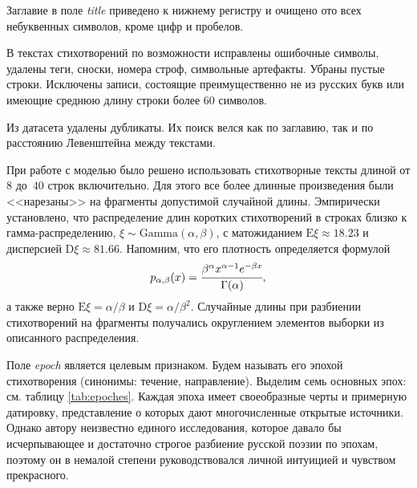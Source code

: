 \documentclass[a4paper,12pt]{article}
\begin{document}
Заглавие в поле \textit{title} приведено к нижнему регистру и очищено ото всех небуквенных символов, кроме цифр и пробелов.

В текстах стихотворений по возможности исправлены ошибочные символы, удалены теги, сноски, номера строф, символьные артефакты. Убраны пустые строки. Исключены записи, состоящие преимущественно не из русских букв или имеющие среднюю длину строки более $60$ символов.

Из датасета удалены дубликаты. Их поиск велся как по заглавию, так и по расстоянию Левенштейна между текстами.

При работе с моделью было решено использовать стихотворные тексты длиной от $8$ до~$40$ строк включительно. Для этого все более длинные произведения были <<нарезаны>> на фрагменты допустимой случайной длины. Эмпирически установлено, что распределение длин коротких стихотворений в строках близко к гамма-распределению, $\xi \sim \text{Gamma}(\alpha, \beta)$, с матожиданием $\text{E} \xi \approx 18.23$ и дисперсией $\text{D} \xi \approx 81.66$. Напомним, что его плотность определяется формулой
\[
    p_{\alpha, \beta}(x) = \cfrac{\beta^\alpha x^{\alpha - 1} e^{-\beta x}}{\Gamma(\alpha)},
\]
а также верно $\text{E} \xi = \alpha / \beta$ и $\text{D} \xi = \alpha / \beta^2$. Случайные длины при разбиении стихотворений на фрагменты получались округлением элементов выборки из описанного распределения.

Поле \textit{epoch} является целевым признаком. Будем называть его эпохой стихотворения (синонимы: течение, направление). Выделим семь основных эпох: см. таблицу \ref{tab:epoches}. Каждая эпоха имеет своеобразные черты и примерную датировку, представление о которых дают многочисленные открытые источники. Однако автору неизвестно единого исследования, которое давало бы исчерпывающее и достаточно строгое разбиение русской поэзии по эпохам, поэтому он в немалой степени руководствовался личной интуицией и чувством прекрасного.
\end{document}
